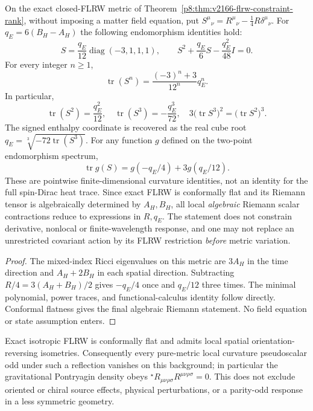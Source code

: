 \documentclass[12pt,a4paper]{article}
\begin{document}
\begin{proposition}
\label{p8:prop:v2170-flrw-traceless-ricci-all-orders}
On the exact closed-FLRW metric of
Theorem~\ref{p8:thm:v2166-flrw-constraint-rank}, without imposing a
matter field equation, put
$S^\mu{}_{\nu}=R^\mu{}_{\nu}-\tfrac14R\delta^\mu{}_{\nu}$.
For $q_E=6(B_H-A_H)$ the following endomorphism identities hold:
\[
 \boxed{S=\frac{q_E}{12}\operatorname{diag}(-3,1,1,1),\qquad
 S^2+\frac{q_E}{6}S-\frac{q_E^2}{48}I=0.}
\]
For every integer $n\ge1$,
\[
 \boxed{\operatorname{tr}(S^n)=\frac{(-3)^n+3}{12^n}q_E^n.}
\]
In particular,
\[
 \boxed{\operatorname{tr}(S^2)=\frac{q_E^2}{12},\quad
 \operatorname{tr}(S^3)=-\frac{q_E^3}{72},\quad
 3\bigl(\operatorname{tr}S^3\bigr)^2
 =\bigl(\operatorname{tr}S^2\bigr)^3.}
\]
The signed enthalpy coordinate is recovered as the real cube root
$q_E=\sqrt[3]{-72\operatorname{tr}(S^3)}$. For any function $g$ defined
on the two-point endomorphism spectrum,
\[
 \boxed{\operatorname{tr}g(S)=g(-q_E/4)+3g(q_E/12).}
\]
These are pointwise finite-dimensional curvature identities, not an
identity for the full spin-Dirac heat trace. Since exact FLRW is
conformally flat and its Riemann tensor is algebraically determined by
$A_H,B_H$, all local \emph{algebraic} Riemann scalar contractions reduce
to expressions in $R,q_E$. The statement does not constrain derivative,
nonlocal or finite-wavelength response, and one may not replace an
unrestricted covariant action by its FLRW restriction \emph{before}
metric variation.
\end{proposition}
\begin{proof}
The mixed-index Ricci eigenvalues on this metric are $3A_H$ in the
time direction and $A_H+2B_H$ in each spatial direction. Subtracting
$R/4=3(A_H+B_H)/2$ gives $-q_E/4$ once and $q_E/12$ three times. The
minimal polynomial, power traces, and functional-calculus identity
follow directly. Conformal flatness gives the final algebraic Riemann
statement. No field equation or state assumption enters.
\end{proof}

\begin{remark}
\label{p8:rem:v2170-flrw-curvature-parity}
Exact isotropic FLRW is conformally flat and admits local spatial
orientation-reversing isometries. Consequently every pure-metric local
curvature pseudoscalar odd under such a reflection vanishes on this
background; in particular the gravitational Pontryagin density obeys
${}^\star\!R_{\mu\nu\rho\sigma}R^{\mu\nu\rho\sigma}=0$.
This does not exclude oriented or chiral source effects, physical
perturbations, or a parity-odd response in a less symmetric geometry.
\end{remark}
\end{document}
